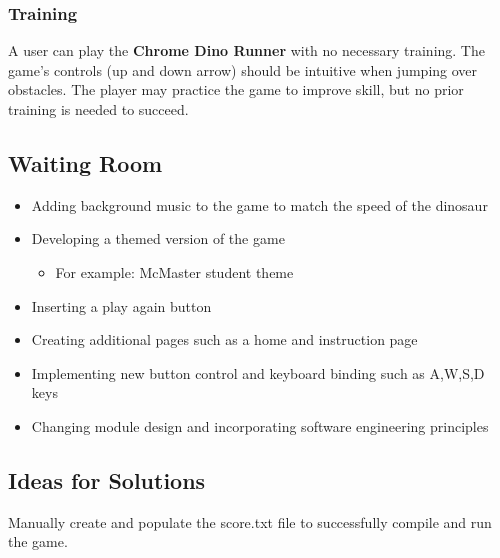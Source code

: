 \documentclass[12pt]{article}
\begin{document}
\subsubsection{Training}
A user can play the \textbf{Chrome Dino Runner} with no necessary training. The game's controls (up and down arrow) should be intuitive when jumping over obstacles. The player may practice the game to improve skill, but no prior training is needed to succeed.  
\subsection{Waiting Room}
\begin{itemize}
 \item Adding background music to the game to match the speed of the dinosaur
 \item Developing a themed version of the game 
 \begin{itemize}
     \item For example: McMaster student theme
 \end{itemize}
 \item Inserting a play again button
 \item Creating additional pages such as a home and instruction page 
 \item Implementing new button control and keyboard binding such as A,W,S,D keys
 \item Changing module design and incorporating software engineering principles
\end{itemize}
\subsection{Ideas for Solutions}
Manually create and populate the score.txt file to successfully compile and run the game.
\end{document}
